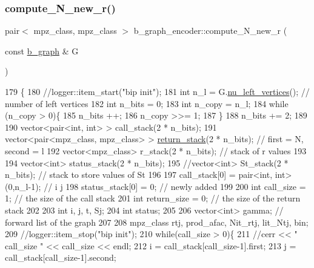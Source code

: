 \subsubsection{\texorpdfstring{compute\+\_\+\+N\+\_\+new\+\_\+r()}{compute\_N\_new\_r()}}
{\footnotesize\ttfamily pair$<$ mpz\+\_\+class, mpz\+\_\+class $>$ b\+\_\+graph\+\_\+encoder\+::compute\+\_\+\+N\+\_\+new\+\_\+r (\begin{DoxyParamCaption}\item[{const \hyperlink{classb__graph}{b\+\_\+graph} \&}]{G }\end{DoxyParamCaption})}


\begin{DoxyCode}
179                                                                            \{
180   \textcolor{comment}{//logger::item\_start("bip init");}
181   \textcolor{keywordtype}{int} n\_l = G.\hyperlink{classb__graph_a5e71d5c97f2501b0b93c17146cf7e68e}{nu\_left\_vertices}(); \textcolor{comment}{// number of left vertices}
182   \textcolor{keywordtype}{int} n\_bits = 0;
183   \textcolor{keywordtype}{int} n\_copy = n\_l;
184   \textcolor{keywordflow}{while} (n\_copy > 0)\{
185     n\_bits ++;
186     n\_copy >>= 1;
187   \}
188   n\_bits += 2;
189 
190   vector<pair<int, int> > call\_stack(2 * n\_bits);
191   vector<pair<mpz\_class, mpz\_class> > \hyperlink{namespacehelper__vars_a6d2100c373830cacd232319a9958652d}{return\_stack}(2 * n\_bits); \textcolor{comment}{// first = N, second = l}
192   vector<mpz\_class> r\_stack(2 * n\_bits); \textcolor{comment}{// stack of r values}
193 
194   vector<int> status\_stack(2 * n\_bits);
195   \textcolor{comment}{//vector<int> St\_stack(2 * n\_bits); // stack to store values of St}
196  
197   call\_stack[0] = pair<int, int> (0,n\_l-1); \textcolor{comment}{// i j }
198   status\_stack[0] = 0; \textcolor{comment}{// newly added}
199  
200   \textcolor{keywordtype}{int} call\_size = 1; \textcolor{comment}{// the size of the call stack}
201   \textcolor{keywordtype}{int} return\_size = 0; \textcolor{comment}{// the size of the return stack}
202 
203   \textcolor{keywordtype}{int} i, j, t, Sj;
204   \textcolor{keywordtype}{int} status;
205  
206   vector<int> gamma; \textcolor{comment}{// forward list  of the graph}
207 
208   mpz\_class rtj, prod\_afac, Nit\_rtj, lit\_Ntj, bin;
209   \textcolor{comment}{//logger::item\_stop("bip init");}
210   \textcolor{keywordflow}{while}(call\_size > 0)\{
211     \textcolor{comment}{//cerr << " call\_size " << call\_size << endl;}
212     i = call\_stack[call\_size-1].first;
213     j = call\_stack[call\_size-1].second;

\end{DoxyCode}

